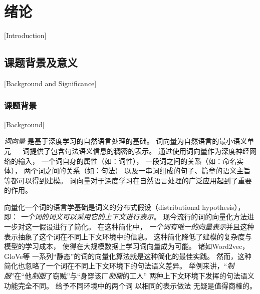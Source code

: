 
\chapter{绪论}[Introduction]\label{chp:intro}

\section{课题背景及意义}[Background and Significance]

\subsection{课题背景}[Background]

\textit{词向量}\cite{DBLP:journals/corr/MikolovSCCD13,pennington-socher-manning:2014:EMNLP2014}
是基于深度学习的自然语言处理的基础。
词向量为自然语言的最小语义单元 --- 词提供了包含句法语义信息的稠密的表示。
通过使用词向量作为深度神经网络的输入，
一个词自身的属性（如：词性\cite{DBLP:journals/corr/HuangXY15}），
一段词之间的关系（如：命名实体\cite{lample-EtAl:2016:N16-1}），
两个词之间的关系（如：句法\cite{dyer-EtAl:2015:ACL-IJCNLP,DBLP:journals/corr/DozatM16}）
以及一串词组成的句子、篇章的语义主旨\cite{kim-rush:2016:EMNLP2016}
等都可以得到建模。
词向量对于深度学习在自然语言处理的广泛应用起到了重要的作用。

向量化一个词的语言学基础是词义的分布式假设（distributional hypothesis）\cite{firth57synopsis}，
即：
\textit{一个词的词义可以采用它的上下文进行表示}。
现今流行的词的向量化方法进一步对这一假设进行了简化。
在这种简化中，
\textit{一个词有唯一的向量表示}并且这种表示抽象了这个词在不同上下文环境中的信息。
这种简化降低了建模的复杂度与模型的学习成本，
使得在大规模数据上学习词向量成为可能。
诸如Word2vec\cite{DBLP:journals/corr/MikolovSCCD13}，GloVe\cite{pennington-socher-manning:2014:EMNLP2014}等
一系列``静态''的词的向量化算法就是这种简化的最佳实践。
然而，这种简化也忽略了一个词在不同上下文环境下的句法语义差异。
举例来讲，``\textit{制服}''在``他\textit{制服}了窃贼''与``身穿该厂\textit{制服}的工人''
两种上下文环境下发挥的句法语义功能完全不同。\cite{guo-EtAl:2014:Coling}
给予不同环境中的两个词
以相同的表示做法
无疑是值得商榷的。

